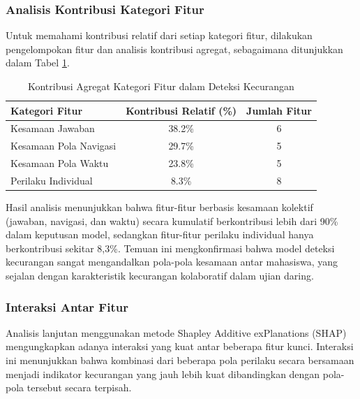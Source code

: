\subsubsection{Analisis Kontribusi Kategori Fitur}

Untuk memahami kontribusi relatif dari setiap kategori fitur, dilakukan pengelompokan fitur dan analisis kontribusi agregat, sebagaimana ditunjukkan dalam Tabel \ref{tabel:kontribusiKategoriFitur}.

\begin{table}[htbp]
\centering
\caption{Kontribusi Agregat Kategori Fitur dalam Deteksi Kecurangan}
\label{tabel:kontribusiKategoriFitur}
\begin{tabular}{|l|c|c|}
\hline
\textbf{Kategori Fitur} & \textbf{Kontribusi Relatif (\%)} & \textbf{Jumlah Fitur} \\
\hline
Kesamaan Jawaban & 38.2\% & 6 \\
\hline
Kesamaan Pola Navigasi & 29.7\% & 5 \\
\hline
Kesamaan Pola Waktu & 23.8\% & 5 \\
\hline
Perilaku Individual & 8.3\% & 8 \\
\hline
\end{tabular}
\end{table}

Hasil analisis menunjukkan bahwa fitur-fitur berbasis kesamaan kolektif (jawaban, navigasi, dan waktu) secara kumulatif berkontribusi lebih dari 90\% dalam keputusan model, sedangkan fitur-fitur perilaku individual hanya berkontribusi sekitar 8,3\%. Temuan ini mengkonfirmasi bahwa model deteksi kecurangan sangat mengandalkan pola-pola kesamaan antar mahasiswa, yang sejalan dengan karakteristik kecurangan kolaboratif dalam ujian daring.

\subsubsection{Interaksi Antar Fitur}

Analisis lanjutan menggunakan metode Shapley Additive exPlanations (SHAP) mengungkapkan adanya interaksi yang kuat antar beberapa fitur kunci. Interaksi ini menunjukkan bahwa kombinasi dari beberapa pola perilaku secara bersamaan menjadi indikator kecurangan yang jauh lebih kuat dibandingkan dengan pola-pola tersebut secara terpisah.

